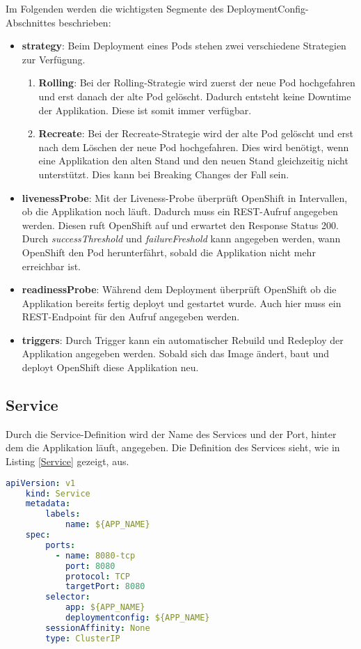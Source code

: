 Im Folgenden werden die wichtigsten Segmente des DeploymentConfig-Abschnittes beschrieben:
\begin{itemize}
	\item \textbf{strategy}: Beim Deployment eines Pods stehen zwei verschiedene Strategien zur Verfügung.
	\begin{enumerate}
		\item \textbf{Rolling}: Bei der Rolling-Strategie wird zuerst der neue Pod hochgefahren und erst danach der alte Pod gelöscht. Dadurch entsteht keine Downtime der Applikation. Diese ist somit immer verfügbar.
		\item \textbf{Recreate}: Bei der Recreate-Strategie wird der alte Pod gelöscht und erst nach dem Löschen der neue Pod hochgefahren. Dies wird benötigt, wenn eine Applikation den alten Stand und den neuen Stand gleichzeitig nicht unterstützt. Dies kann bei Breaking Changes der Fall sein.
	\end{enumerate}
	\item \textbf{livenessProbe}: Mit der Liveness-Probe überprüft OpenShift in Intervallen, ob die Applikation noch läuft. Dadurch muss ein REST-Aufruf angegeben werden. Diesen ruft OpenShift auf und erwartet den Response Status 200. Durch \textit{successThreshold} und \textit{failureFreshold} kann angegeben werden, wann OpenShift den Pod herunterfährt, sobald die Applikation nicht mehr erreichbar ist.
	\item \textbf{readinessProbe}: Während dem Deployment überprüft OpenShift ob die Applikation bereits fertig deployt und gestartet wurde. Auch hier muss ein REST-Endpoint für den Aufruf angegeben werden.
	\item \textbf{triggers}: Durch Trigger kann ein automatischer Rebuild und Redeploy der Applikation angegeben werden. Sobald sich das Image ändert, baut und deployt OpenShift diese Applikation neu. 
\end{itemize}

\subsection{Service}
Durch die Service-Definition wird der Name des Services und der Port, hinter dem die Applikation läuft, angegeben. Die Definition des Services sieht, wie in Listing \ref{Service} gezeigt, aus.

\begin{lstlisting}[language=yml, caption=maven-pipeline.yml - Servicem, label=Service]
	apiVersion: v1
	kind: Service
	metadata:
		labels:
			name: ${APP_NAME}
	spec:
		ports:
		  - name: 8080-tcp
			port: 8080
			protocol: TCP
			targetPort: 8080
		selector:
			app: ${APP_NAME}
			deploymentconfig: ${APP_NAME}
		sessionAffinity: None
		type: ClusterIP
\end{lstlisting}

